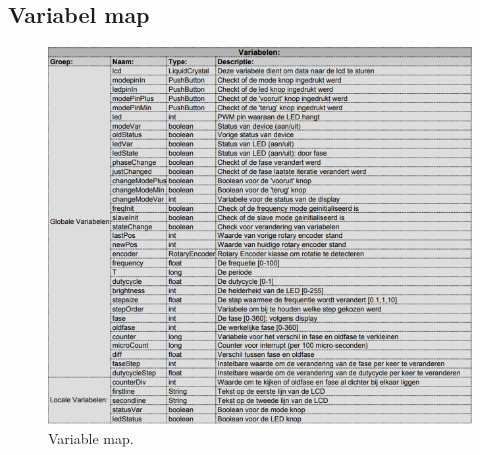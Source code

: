 \documentclass[a4paper,dutch]{article}
\begin{document}
\begin{appendices}
\section{Variabel map}
\label{appendix:vmap}
\begin{figure}[H]
\centering
\includegraphics[width=1\textwidth]{varmap.png}
\caption{\label{fig:varmap}Variable map.}
\end{figure}

\end{appendices}
\end{document}
